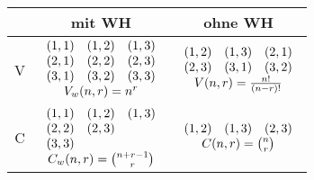 \documentclass[a4paper,twocolumn]{article}
\begin{document}
\begin{tabular}{c|c|c}
                &       mit WH        &      ohne WH      \\
    \hline
    V           & $\begin{array}{ccc}
                  (1,1) & (1,2) & (1,3) \\
                  (2,1) & (2,2) & (2,3) \\
                  (3,1) & (3,2) & (3,3) \\
                  \multicolumn{3}{c}{V_w(n,r) = n^r} \\
                  \end{array}$
                                      & $\begin{array}{ccc}
                                        (1,2) & (1,3) & (2,1) \\
                                        (2,3) & (3,1) & (3,2) \\
                                        \multicolumn{3}{c}{
                                            V(n,r) = \frac{n!}{(n-r)!}} \\
                                        \end{array}$ \\
    \hline
    C           & $\begin{array}{ccc}
                  (1,1) & (1,2) & (1,3) \\
                  (2,2) & (2,3) & \\
                  (3,3) &       & \\
                  \multicolumn{3}{c}{C_w(n,r) = {n+r-1 \choose r}} \\
                  \end{array}$
                                      & $\begin{array}{ccc}
                                        (1,2) & (1,3) & (2,3) \\
                                        \multicolumn{3}{c}{C(n,r)
                                            = {n \choose r}}
                                        \end{array}$ \\
\end{tabular}
\end{document}
